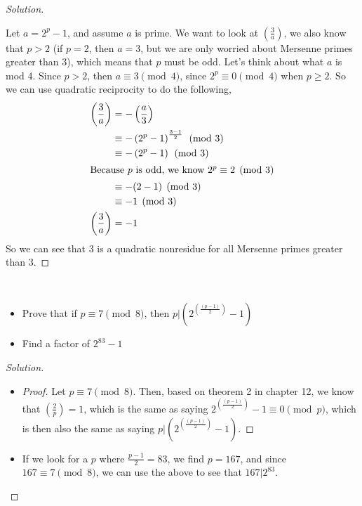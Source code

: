 \documentclass[11pt]{article}
\newcommand\leg[2]{\left(\frac{#1}{#2}\right)}
\newenvironment{problem}[2][Problem]{\begin{trivlist}
\item[\hskip \labelsep {\bfseries #1}\hskip \labelsep {\bfseries #2.}]}{\end{trivlist}}
\newenvironment{solution}
  {\renewcommand\qedsymbol{$~$}\begin{proof}[Solution]$ $\par\nobreak\ignorespaces}
  {\end{proof}}
\begin{document}
\begin{solution}
  Let $a=2^p -1$, and assume $a$ is prime. We want to look at $\leg{3}{a}$, we also know that $p>2$ (if $p=2$, then $a=3$, but we are only worried about Mersenne primes greater than 3), which means that $p$ must be odd. Let's think about what $a$ is mod 4. Since $p>2$, then $a\equiv 3 \pmod{4}$, since $2^p\equiv 0 \pmod{4}$ when $p\geq 2$. So we can use quadratic reciprocity to do the following,
  \begin{align*}
    \leg{3}{a} & = -\leg{a}{3}                                          \\
               & \equiv -\left( 2^p - 1\right)^{\frac{3-1}{2}} \pmod{3} \\
               & \equiv -\left(2^p - 1\right) \pmod{3}                  \\
    \intertext{Because $p$ is odd, we know $2^p\equiv 2 \pmod{3}$}
               & \equiv -(2 - 1) \pmod{3}                               \\
               & \equiv -1 \pmod{3}                                     \\
    \leg{3}{a} & = -1                                                   \\
  \end{align*}
  So we can see that 3 is a quadratic nonresidue for all Mersenne primes greater than 3.
\end{solution}


\begin{problem}{4}
~\\
\begin{itemize}
  \item [(a)] Prove that if $p\equiv 7\pmod{8}$, then $p|\left(2^{\left(\frac{(p-1)}{2}\right)}-1\right)$
  \item [(b)] Find a factor of $2^{83}-1$
\end{itemize}
\end{problem}

\begin{solution}
  \renewcommand\qedsymbol{$\square$}
  \begin{itemize}
    \item [(a)]
          \begin{proof}
            Let $p\equiv 7 \pmod{8}$. Then, based on theorem 2 in chapter 12, we know that $\leg{2}{p}=1$, which is the same as saying $2^{\left(\frac{(p-1)}{2}\right)}-1\equiv 0 \pmod{p}$, which is then also the same as saying $p|\left(2^{\left(\frac{(p-1)}{2}\right)}-1\right)$.
          \end{proof}
    \item [(b)] If we look for a $p$ where $\frac{p-1}{2}=83$, we find $p=167$, and since $167\equiv 7 \pmod{8}$, we can use the above to see that $167|2^{83}$.
  \end{itemize}
  \renewcommand\qedsymbol{$~$}
\end{solution}
\end{document}
